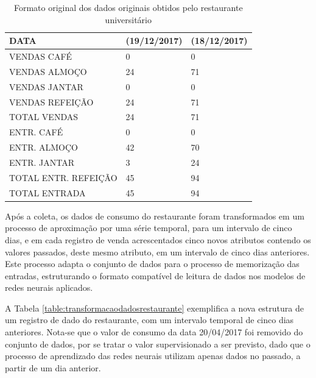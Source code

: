         	\begin{table}[!ht]
        	    \centering
        	    \caption{Formato original dos dados originais obtidos pelo restaurante universitário}
                \begin{tabular}{l|l|l}
                    \hline
                    DATA                  & (19/12/2017) & (18/12/2017) \\ \hline
                    VENDAS CAFÉ           & 0            & 0            \\
                    VENDAS ALMOÇO         & 24           & 71           \\
                    VENDAS JANTAR         & 0            & 0            \\
                    VENDAS REFEIÇÃO      & 24           & 71           \\
                    TOTAL VENDAS          & 24           & 71           \\
                    ENTR. CAFÉ            & 0            & 0            \\
                    ENTR. ALMOÇO          & 42           & 70           \\
                    ENTR. JANTAR          & 3            & 24           \\
                    TOTAL ENTR. REFEIÇÃO & 45           & 94           \\
                    TOTAL ENTRADA         & 45           & 94           \\ \hline
                \end{tabular}
               
                \label{table:dadosrestaurante}
            \end{table}
            
            Após a coleta, os dados de consumo do restaurante foram transformados em um processo de aproximação por uma série temporal, para um intervalo de cinco dias, e em cada registro de venda  acrescentados cinco novos atributos contendo os valores passados, deste mesmo atributo, em um intervalo de cinco dias anteriores. Este processo adapta o conjunto de dados para o processo de memorização das entradas, estruturando o formato compatível de leitura de dados nos modelos de redes neurais aplicados.
            
            A Tabela \ref{table:transformacaodadosrestaurante} exemplifica a nova estrutura de um registro de dado do restaurante, com um intervalo temporal de cinco dias anteriores. Nota-se que o valor de consumo da data 20/04/2017 foi removido do conjunto de dados, por se tratar o valor supervisionado a ser previsto, dado que o processo de aprendizado das redes neurais utilizam apenas dados no passado, a partir de um dia anterior.
            
